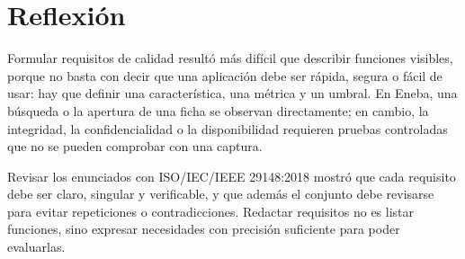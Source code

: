 \documentclass[10pt,a4paper]{article}
\begin{document}
	\normalsize
	
	\section{Reflexión}
	
	Formular requisitos de calidad resultó más difícil que describir funciones visibles, porque no basta con decir que una aplicación debe ser rápida, segura o fácil de usar: hay que definir una característica, una métrica y un umbral. En Eneba, una búsqueda o la apertura de una ficha se observan directamente; en cambio, la integridad, la confidencialidad o la disponibilidad requieren pruebas controladas que no se pueden comprobar con una captura.
	
	Revisar los enunciados con ISO/IEC/IEEE 29148:2018 mostró que cada requisito debe ser claro, singular y verificable, y que además el conjunto debe revisarse para evitar repeticiones o contradicciones. Redactar requisitos no es listar funciones, sino expresar necesidades con precisión suficiente para poder evaluarlas.
	
	
	
	
\end{document}
